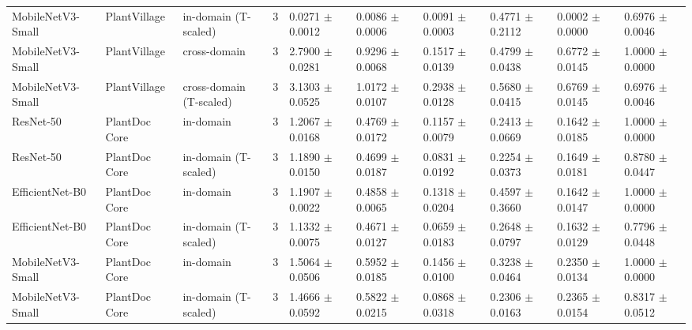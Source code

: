 \begin{table}
\begin{tabular}{llllllllll}
MobileNetV3-Small & PlantVillage & in-domain (T-scaled) & 3 & 0.0271 $\pm$ 0.0012 & 0.0086 $\pm$ 0.0006 & 0.0091 $\pm$ 0.0003 & 0.4771 $\pm$ 0.2112 & 0.0002 $\pm$ 0.0000 & 0.6976 $\pm$ 0.0046 \\
MobileNetV3-Small & PlantVillage & cross-domain & 3 & 2.7900 $\pm$ 0.0281 & 0.9296 $\pm$ 0.0068 & 0.1517 $\pm$ 0.0139 & 0.4799 $\pm$ 0.0438 & 0.6772 $\pm$ 0.0145 & 1.0000 $\pm$ 0.0000 \\
MobileNetV3-Small & PlantVillage & cross-domain (T-scaled) & 3 & 3.1303 $\pm$ 0.0525 & 1.0172 $\pm$ 0.0107 & 0.2938 $\pm$ 0.0128 & 0.5680 $\pm$ 0.0415 & 0.6769 $\pm$ 0.0145 & 0.6976 $\pm$ 0.0046 \\
ResNet-50 & PlantDoc Core & in-domain & 3 & 1.2067 $\pm$ 0.0168 & 0.4769 $\pm$ 0.0172 & 0.1157 $\pm$ 0.0079 & 0.2413 $\pm$ 0.0669 & 0.1642 $\pm$ 0.0185 & 1.0000 $\pm$ 0.0000 \\
ResNet-50 & PlantDoc Core & in-domain (T-scaled) & 3 & 1.1890 $\pm$ 0.0150 & 0.4699 $\pm$ 0.0187 & 0.0831 $\pm$ 0.0192 & 0.2254 $\pm$ 0.0373 & 0.1649 $\pm$ 0.0181 & 0.8780 $\pm$ 0.0447 \\
EfficientNet-B0 & PlantDoc Core & in-domain & 3 & 1.1907 $\pm$ 0.0022 & 0.4858 $\pm$ 0.0065 & 0.1318 $\pm$ 0.0204 & 0.4597 $\pm$ 0.3660 & 0.1642 $\pm$ 0.0147 & 1.0000 $\pm$ 0.0000 \\
EfficientNet-B0 & PlantDoc Core & in-domain (T-scaled) & 3 & 1.1332 $\pm$ 0.0075 & 0.4671 $\pm$ 0.0127 & 0.0659 $\pm$ 0.0183 & 0.2648 $\pm$ 0.0797 & 0.1632 $\pm$ 0.0129 & 0.7796 $\pm$ 0.0448 \\
MobileNetV3-Small & PlantDoc Core & in-domain & 3 & 1.5064 $\pm$ 0.0506 & 0.5952 $\pm$ 0.0185 & 0.1456 $\pm$ 0.0100 & 0.3238 $\pm$ 0.0464 & 0.2350 $\pm$ 0.0134 & 1.0000 $\pm$ 0.0000 \\
MobileNetV3-Small & PlantDoc Core & in-domain (T-scaled) & 3 & 1.4666 $\pm$ 0.0592 & 0.5822 $\pm$ 0.0215 & 0.0868 $\pm$ 0.0318 & 0.2306 $\pm$ 0.0163 & 0.2365 $\pm$ 0.0154 & 0.8317 $\pm$ 0.0512 \\
\bottomrule
\end{tabular}
\end{table}
